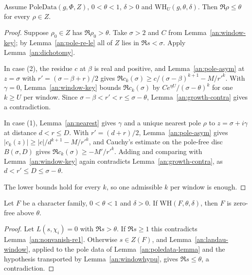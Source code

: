 \begin{lemma}\label{an:landau-window}
Assume $\mathrm{PoleData}(g,\Phi,Z)$, $0<\theta<1$, $\delta>0$ and
$\mathrm{WH}_U(g,\theta,\delta)$. Then $\Re\rho\le\theta$ for every
$\rho\in Z$.
\end{lemma}
\begin{proof}
Suppose $\rho_0\in Z$ has $\Re\rho_0>\theta$. Take $\sigma>2$ and $C$
from Lemma~\ref{an:window-key}; by Lemma~\ref{an:pole-re-le} all of $Z$
lies in $\Re s<\sigma$. Apply Lemma~\ref{an:dichotomy}.

In case (2), the residue $c$ at $\beta$ is real and positive, and
Lemma~\ref{an:pole-asym} at $z=\sigma$ with $r'=(\sigma-\beta+r)/2$ gives
$\Re c_k(\sigma)\ge c/(\sigma-\beta)^{k+1}-M/r'^k$. With $\gamma=0$,
Lemma~\ref{an:window-key} bounds $\Re c_k(\sigma)$ by
$Ce^{\eta U}/(\sigma-\theta)^k$ for one $k\ge U$ per window. Since
$\sigma-\beta<r'<r\le\sigma-\theta$, Lemma~\ref{an:growth-contra} gives a
contradiction.

In case (1), Lemma~\ref{an:nearest} gives $\gamma$ and a unique nearest
pole $\rho$ to $z=\sigma+i\gamma$ at distance $d<r\le D$. With
$r'=(d+r)/2$, Lemma~\ref{an:pole-asym} gives
$|c_k(z)|\ge|c|/d^{k+1}-M/r'^k$, and Cauchy's estimate on the pole-free
disc $B(\sigma,D)$ gives $\Re c_k(\sigma)\ge-M'/r'^k$. Adding and
comparing with Lemma~\ref{an:window-key} again contradicts
Lemma~\ref{an:growth-contra}, as $d<r'\le D\le\sigma-\theta$.

The lower bounds hold for every $k$, so one admissible $k$ per window is
enough.
\end{proof}

\begin{lemma}\label{an:lemmaL}
Let $F$ be a character family, $0<\theta<1$ and $\delta>0$. If
$\mathrm{WH}(F,\theta,\delta)$, then $F$ is zero-free above $\theta$.
\end{lemma}
\begin{proof}
Let $L(s,\chi_i)=0$ with $\Re s>\theta$. If $\Re s\ge1$ this contradicts
Lemma~\ref{an:nonvanish-re1}. Otherwise $s\in Z(F)$, and
Lemma~\ref{an:landau-window}, applied to the pole data of
Lemma~\ref{an:poledata-lemma} and the hypothesis transported by
Lemma~\ref{an:windowhypu}, gives $\Re s\le\theta$, a contradiction.
\end{proof}

